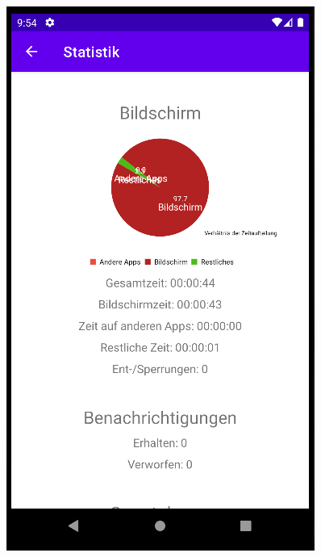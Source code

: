 \documentclass[ngerman]{tutorial}
\begin{document}
\begin{center}
    \includegraphics[scale=0.45]{stats_session_1.png}
\end{center}
\end{document}
